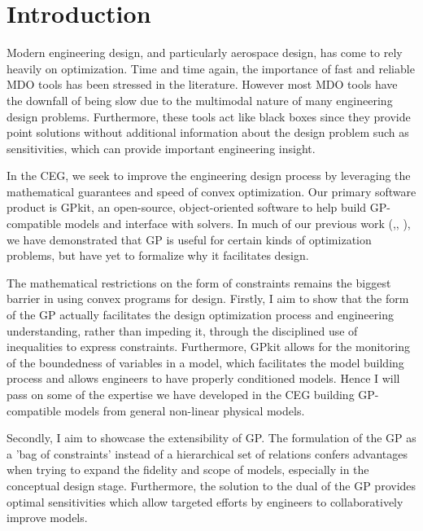 \chapter{Introduction}
\label{ch1_intro}

Modern engineering design, and particularly aerospace design, has come to rely
heavily on optimization. Time and time again, the importance of fast and
reliable \gls{MDO} tools has been stressed in the literature. %
However most \gls{MDO} tools
have the downfall of being slow due to the multimodal nature of many
engineering design problems. Furthermore, these tools act like black boxes since
they provide point solutions without additional information about the design problem
such as sensitivities, which can provide important engineering insight.

In the \gls{CEG}, we seek to improve the engineering design process by
leveraging the mathematical guarantees and speed of convex optimization. Our primary
software product is GPkit, an
open-source, object-oriented software to help build \gls{GP}-compatible models and
interface with solvers. In much of our previous work
(\cite{gp_ac_design},\cite{SP_ac_design}, \cite{sp_engine}), we have demonstrated that
\gls{GP} is useful for certain kinds of optimization problems, but have yet to formalize why it
facilitates design.

The mathematical restrictions on the form of constraints remains the biggest
barrier in using convex programs for design. Firstly, I
aim to show that the form of the \gls{GP} actually facilitates the design
optimization process
and engineering understanding, rather than impeding it, through the disciplined use
of inequalities to express constraints. Furthermore, GPkit allows for the
monitoring of the boundedness of variables in a model, which facilitates the model
building process and allows engineers
to have properly conditioned models. Hence I will
pass on some of the expertise we have developed in the \gls{CEG} building
\gls{GP}-compatible models from general non-linear physical models.

Secondly, I aim to showcase the extensibility of \gls{GP}.
The formulation of the \gls{GP} as a 'bag of
constraints' instead of a hierarchical set of relations confers advantages
when trying to expand the fidelity and scope of models, especially in the
conceptual design stage. Furthermore, the solution to the dual of the \gls{GP}
provides optimal sensitivities which allow targeted efforts by engineers to
collaboratively improve models.

